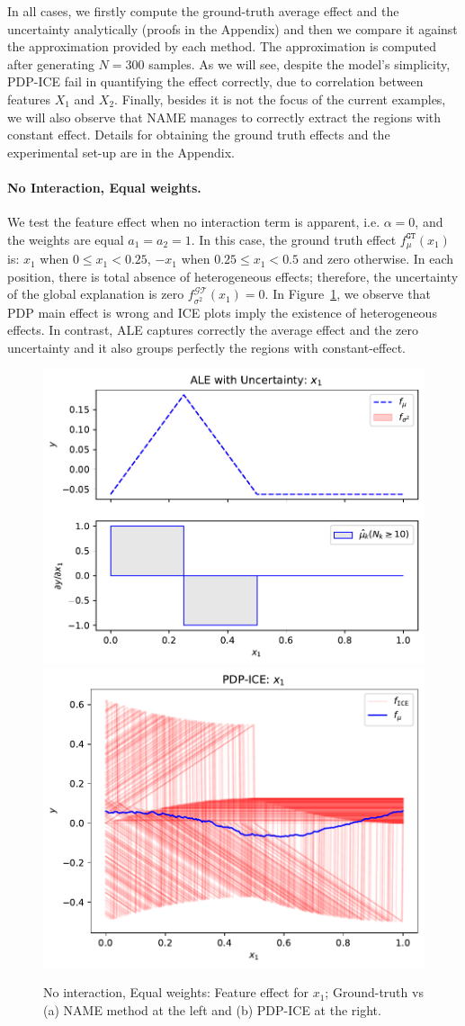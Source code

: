 \documentclass[twoside]{article}
\begin{document}
In all cases, we firstly compute the ground-truth average effect and
the uncertainty analytically (proofs in the Appendix) and then we
compare it against the approximation provided by each method. The
approximation is computed after generating \(N=300\) samples. As we
will see, despite the model's simplicity, PDP-ICE fail in quantifying
the effect correctly, due to correlation between features \(X_1\) and
\(X_2\). Finally, besides it is not the focus of the current examples,
we will also observe that NAME manages to correctly extract the
regions with constant effect. Details for obtaining the ground truth
effects and the experimental set-up are in the Appendix.

\paragraph{No Interaction, Equal weights.}

We test the feature effect when no interaction term is apparent,
i.e. \(\alpha=0\), and the weights are equal \(a_1=a_2=1\).  In this
case, the ground truth effect \(f_\mu^{\mathtt{GT}}(x_1)\) is: \(x_1\)
when \(0 \leq x_1 < 0.25\), \(-x_1\) when \(0.25 \leq x_1 < 0.5\) and
zero otherwise. In each position, there is total absence of
heterogeneous effects; therefore, the uncertainty of the global
explanation is zero \(f^{\mathcal{GT}}_{\sigma^2}(x_1) = 0\). In
Figure~\ref{fig:synth-ex-1-case-1}, we observe that PDP main effect is
wrong and ICE plots imply the existence of heterogeneous effects. In
contrast, ALE captures correctly the average effect and the zero
uncertainty and it also groups perfectly the regions with
constant-effect.

\begin{figure}[h]
  \centering
  \includegraphics[width=.23\textwidth]{example_1/dale_feat_0.pdf}
  \includegraphics[width=.23\textwidth]{example_1/pdp_ice_feat_0.pdf}
  \caption{No interaction, Equal weights: Feature effect for \(x_1\);
    Ground-truth vs (a) NAME method at the left and (b) PDP-ICE at the
    right.}
  \label{fig:synth-ex-1-case-1}
\end{figure}
\end{document}
